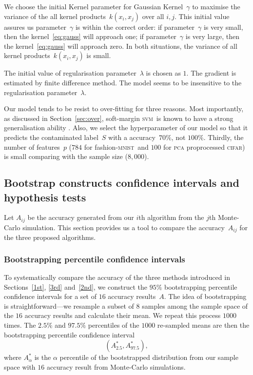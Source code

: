 \documentclass[12pt]{article} %
\newcommand{\svm}{\textsc{svm}}
\newcommand{\mnist}{fashion-\textsc{mnist}\ }
\begin{document}
We choose the initial Kernel parameter for Gaussian Kernel~$\gamma$  to maximise the variance of the all kernel products~$k(x_i,x_j)$ over all $i,j$. 
This initial value assures us parameter~$\gamma$ is within the correct order: if parameter~$\gamma$ is very small, then the kernel~\eqref{eq:gauss} will approach one; if parameter~$\gamma$ is very large, then the kernel~\eqref{eq:gauss} will approach zero. In both situations, the variance of all kernel products~$k(x_i,x_j)$ is small.

The initial value of regularisation parameter~$\lambda$ is chosen as $1$.
The gradient is estimated by finite difference method.
The model seems to be insensitive to the regularisation parameter~$\lambda$.

Our model tends to be resist to over-fitting for three reasons. Most importantly, as discussed in Section~\ref{sec:over}, soft-margin \svm\ is known to have a strong generalisation ability \citep{NIPS2012_4500,Cortes1995,Seeger:2003:PGE:944919.944929}. Also, we select the hyperparameter of our model so that it predicts the contaminated label~$S$ with a accuracy~$70\%$, not $100\%$. Thirdly, the number of features~$p$ ($784$ for \mnist and $100$ for \textsc{pca} proprocessed \textsc{cifar}) is small comparing with the sample size ($8,000$).

\subsection{Bootstrap constructs confidence intervals and hypothesis tests}
Let $A_{ij}$ be the accuracy generated from our {$i$}th algorithm from the $j$th Monte-Carlo simulation. This section provides us a tool to compare the accuracy~$A_{ij}$ for the three proposed algorithms.
\subsubsection{Bootstrapping percentile confidence intervals}\label{ci}
To systematically compare the accuracy of the three methods introduced in Sections~\ref{1st}, \ref{3rd} and~\ref{2nd}, we construct the $95\%$ bootstrapping percentile confidence intervals for a set of $16$ accuracy results~$A$. The idea of bootstrapping  is straightforward---we resample a subset of $8$ samples among the sample space of the $16$ accuracy results and calculate their mean. We repeat this process $1000$ times. The $2.5\%$ and $97.5\%$ percentiles of the $1000$ re-sampled means are then the bootstrapping percentile confidence interval
\begin{equation}
({A}^*_{2.5}, {A}^*_{97.5}), \label{eq:boot}
\end{equation}
where $A^*_{\alpha}$ is the $\alpha$ percentile of the bootstrapped distribution from our sample space with $16$ accuracy result from Monte-Carlo simulations.
\end{document}
